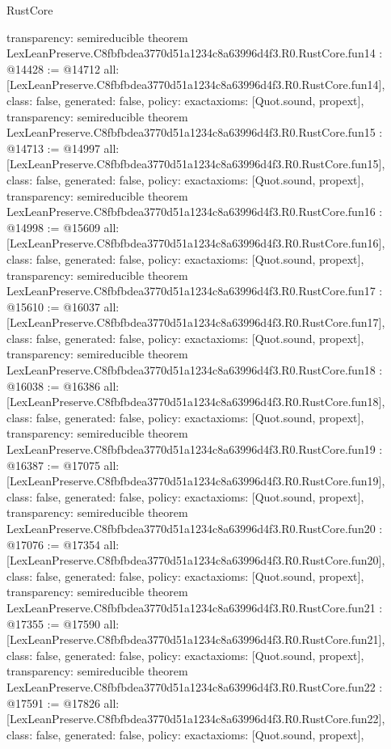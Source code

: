 \begin{lexlean}{RustCore}
\begin{coremodule}
{  transparency: semireducible
}
theorem LexLeanPreserve.C8fbfbdea3770d51a1234c8a63996d4f3.R0.RustCore.fun14 : @14428 := @14712 {
  all: [LexLeanPreserve.C8fbfbdea3770d51a1234c8a63996d4f3.R0.RustCore.fun14],
  class: false,
  generated: false,
  policy: exact{axioms: [Quot.sound, propext]},
  transparency: semireducible
}
theorem LexLeanPreserve.C8fbfbdea3770d51a1234c8a63996d4f3.R0.RustCore.fun15 : @14713 := @14997 {
  all: [LexLeanPreserve.C8fbfbdea3770d51a1234c8a63996d4f3.R0.RustCore.fun15],
  class: false,
  generated: false,
  policy: exact{axioms: [Quot.sound, propext]},
  transparency: semireducible
}
theorem LexLeanPreserve.C8fbfbdea3770d51a1234c8a63996d4f3.R0.RustCore.fun16 : @14998 := @15609 {
  all: [LexLeanPreserve.C8fbfbdea3770d51a1234c8a63996d4f3.R0.RustCore.fun16],
  class: false,
  generated: false,
  policy: exact{axioms: [Quot.sound, propext]},
  transparency: semireducible
}
theorem LexLeanPreserve.C8fbfbdea3770d51a1234c8a63996d4f3.R0.RustCore.fun17 : @15610 := @16037 {
  all: [LexLeanPreserve.C8fbfbdea3770d51a1234c8a63996d4f3.R0.RustCore.fun17],
  class: false,
  generated: false,
  policy: exact{axioms: [Quot.sound, propext]},
  transparency: semireducible
}
theorem LexLeanPreserve.C8fbfbdea3770d51a1234c8a63996d4f3.R0.RustCore.fun18 : @16038 := @16386 {
  all: [LexLeanPreserve.C8fbfbdea3770d51a1234c8a63996d4f3.R0.RustCore.fun18],
  class: false,
  generated: false,
  policy: exact{axioms: [Quot.sound, propext]},
  transparency: semireducible
}
theorem LexLeanPreserve.C8fbfbdea3770d51a1234c8a63996d4f3.R0.RustCore.fun19 : @16387 := @17075 {
  all: [LexLeanPreserve.C8fbfbdea3770d51a1234c8a63996d4f3.R0.RustCore.fun19],
  class: false,
  generated: false,
  policy: exact{axioms: [Quot.sound, propext]},
  transparency: semireducible
}
theorem LexLeanPreserve.C8fbfbdea3770d51a1234c8a63996d4f3.R0.RustCore.fun20 : @17076 := @17354 {
  all: [LexLeanPreserve.C8fbfbdea3770d51a1234c8a63996d4f3.R0.RustCore.fun20],
  class: false,
  generated: false,
  policy: exact{axioms: [Quot.sound, propext]},
  transparency: semireducible
}
theorem LexLeanPreserve.C8fbfbdea3770d51a1234c8a63996d4f3.R0.RustCore.fun21 : @17355 := @17590 {
  all: [LexLeanPreserve.C8fbfbdea3770d51a1234c8a63996d4f3.R0.RustCore.fun21],
  class: false,
  generated: false,
  policy: exact{axioms: [Quot.sound, propext]},
  transparency: semireducible
}
theorem LexLeanPreserve.C8fbfbdea3770d51a1234c8a63996d4f3.R0.RustCore.fun22 : @17591 := @17826 {
  all: [LexLeanPreserve.C8fbfbdea3770d51a1234c8a63996d4f3.R0.RustCore.fun22],
  class: false,
  generated: false,
  policy: exact{axioms: [Quot.sound, propext]},
}
\end{coremodule}
\end{lexlean}
